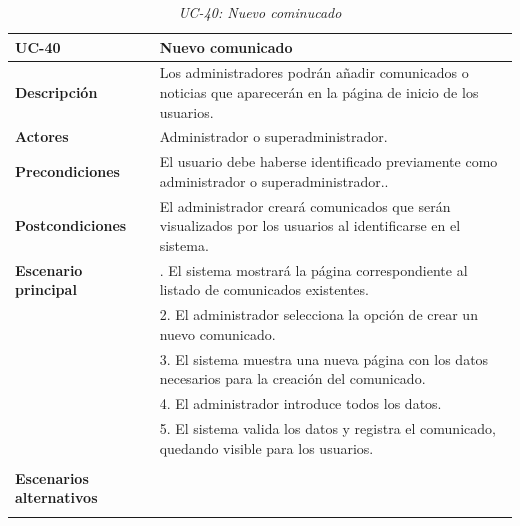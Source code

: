 \begin{table}
  \begin{center}
    \begin{tabularx}{16.4cm}{|l|X|}
      \hline
      \textbf{UC-40} & \textbf{Nuevo comunicado}\\
      \hline
      \textbf{Descripción} & Los administradores podrán añadir comunicados o noticias que aparecerán en la página de inicio de los usuarios. \\
      \hline
      \textbf{Actores} & Administrador o superadministrador.\\
      \hline
      \textbf{Precondiciones} & El usuario debe haberse identificado previamente como administrador o superadministrador..\\
      \hline
      \textbf{Postcondiciones} & El administrador creará comunicados que serán visualizados por los usuarios al identificarse en el sistema. \\
      \hline
      \textbf{Escenario principal} & \smallskip 1. El sistema mostrará la página correspondiente al listado de comunicados existentes.\\
      & 2. El administrador selecciona la opción de crear un nuevo comunicado. \\
      & 3. El sistema muestra una nueva página con los datos necesarios para la creación del comunicado.\\
      & 4. El administrador introduce todos los datos.\\
      & 5. El sistema valida los datos y registra el comunicado, quedando visible para los usuarios.\\
      & \\
      \hline
      \textbf{Escenarios alternativos} & \\
      & \\
      \hline
    \end{tabularx}
    \caption{\textit{UC-40: Nuevo cominucado}}
    \label{tab:CU-nuevo-comunicado}
  \end{center}
\end{table}


